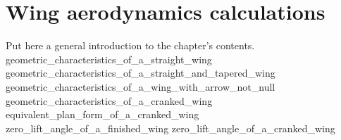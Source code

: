 \documentclass[[12pt,twoside]{book}
\begin{document}
%
%
\chapter%
   [Wing aerodynamics calculations]%
   {Wing aerodynamics calculations}
\label{chap:Wing}

\setcounter{minitocdepth}{2}%
\minitoc %

\vspace{\baselineskip}

\noindent
Put here a general introduction to the chapter's contents.
%
{geometric_characteristics_of_a_straight_wing}
{geometric_characteristics_of_a_straight_and_tapered_wing}
{geometric_characteristics_of_a_wing_with_arrow_not_null}
{geometric_characteristics_of_a_cranked_wing}
{equivalent_plan_form_of_a_cranked_wing}
{zero_lift_angle_of_a_finished_wing}
{zero_lift_angle_of_a_cranked_wing}
\end{document}
